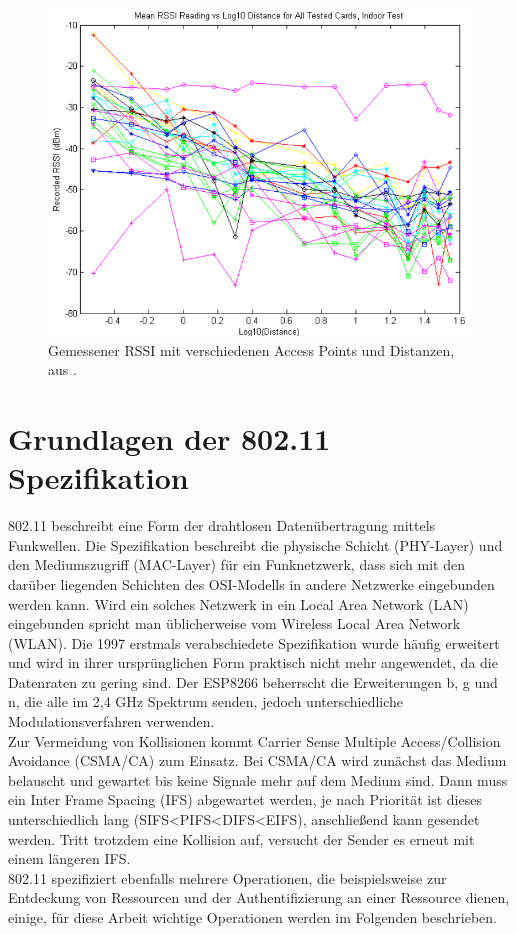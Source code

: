 \begin{figure}[h]
  \centering
	\includegraphics[width=\textwidth]{images/luiRSSI.png}
  \caption{Gemessener RSSI mit verschiedenen Access Points und Distanzen, aus \cite{lui2011differences}.}
  \label{fig:luiRSSI}
\end{figure}

\section{Grundlagen der 802.11 Spezifikation}
\label{ch:phase1:sec:grundlagen}
802.11 beschreibt eine Form der drahtlosen Datenübertragung mittels Funkwellen.
Die Spezifikation beschreibt die physische Schicht (PHY-Layer) und den Mediumszugriff (MAC-Layer) für ein Funknetzwerk, dass sich mit den darüber liegenden Schichten des OSI-Modells in andere Netzwerke eingebunden werden kann.
Wird ein solches Netzwerk in ein Local Area Network (LAN) eingebunden spricht man üblicherweise vom Wireless Local Area Network (WLAN).
Die 1997 erstmals verabschiedete Spezifikation wurde häufig erweitert und wird in ihrer ursprünglichen Form praktisch nicht mehr angewendet, da die Datenraten zu gering sind.
Der ESP8266 beherrscht die Erweiterungen b, g und n, die alle im 2,4 GHz Spektrum senden, jedoch unterschiedliche Modulationsverfahren verwenden.\\
Zur Vermeidung von Kollisionen kommt Carrier Sense Multiple Access/Collision Avoidance (CSMA/CA) zum Einsatz.
Bei CSMA/CA wird zunächst das Medium belauscht und gewartet bis keine Signale mehr auf dem Medium sind. 
Dann muss ein Inter Frame Spacing (IFS) abgewartet werden, je nach Priorität ist dieses unterschiedlich lang (SIFS<PIFS<DIFS<EIFS), anschließend kann gesendet werden.
Tritt trotzdem eine Kollision auf, versucht der Sender es erneut mit einem längeren IFS.\\
802.11 spezifiziert ebenfalls mehrere Operationen, die beispielsweise zur Entdeckung von Ressourcen und der Authentifizierung an einer Ressource dienen, einige, für diese Arbeit wichtige Operationen werden im Folgenden beschrieben.

